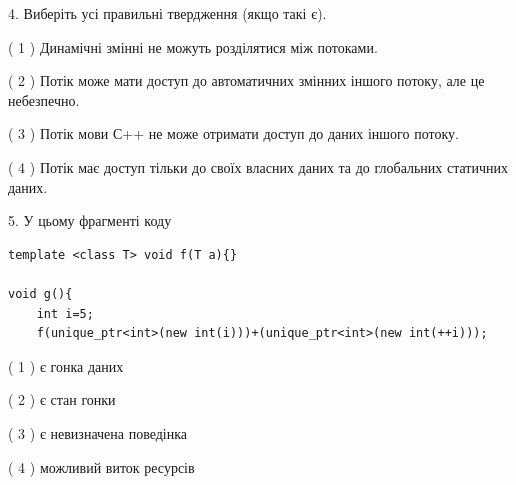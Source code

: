 \documentclass[12pt, ukrainian]{article}
\begin{document}
\begin {large}
{%
4. Виберіть усі правильні твердження (якщо такі є).\par
\vspace{2mm}

( 1 ) Динамічні змінні не можуть розділятися між потоками.%

( 2 ) Потік може мати доступ до автоматичних змінних іншого потоку, але це небезпечно.%

( 3 ) Потік мови С++ не може отримати доступ до даних іншого потоку.%

( 4 ) Потік має доступ тільки до своїх власних даних та до глобальних статичних даних.%


5. У цьому фрагменті коду
\begin{verbatim}
template <class T> void f(T a){}

void g(){
    int i=5;
    f(unique_ptr<int>(new int(i)))+(unique_ptr<int>(new int(++i)));
\end{verbatim}
( 1 ) є гонка даних%

( 2 ) є стан гонки%

( 3 ) є невизначена поведінка%

( 4 ) можливий виток ресурсів%
}
\end {large}
\end{document}
